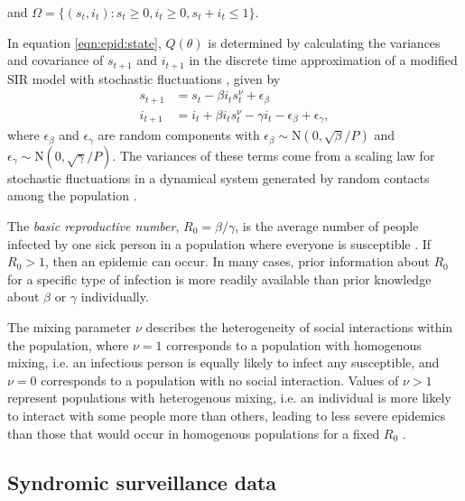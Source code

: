 \noindent and $\Omega = \{(s_t,i_t): s_t \ge 0, i_t \ge 0, s_t + i_t \le 1\}$.

In equation \eqref{eqn:epid:state}, $Q(\theta)$ is determined by calculating the variances and covariance of $s_{t+1}$ and $i_{t+1}$ in the discrete time approximation of a modified SIR model with stochastic fluctuations \citep{herwaarden1995stochepid, dangerfield2009stochepid, anderson2004sars}, given by
\begin{align}
s_{t+1} &= s_t - \beta i_ts^\nu_t + \epsilon_\beta \label{eqn:disc:sus} \\
i_{t+1} &= i_t + \beta i_ts^\nu_t - \gamma i_t - \epsilon_\beta + \epsilon_\gamma, \label{eqn:disc:inf}
\end{align}
where $\epsilon_\beta$ and $\epsilon_\gamma$ are random components with $\epsilon_\beta \sim \mbox{N}(0, \sqrt{\beta} / P)$ and $\epsilon_\gamma \sim \mbox{N}(0, \sqrt{\gamma} / P)$. The variances of these terms come from a scaling law for stochastic fluctuations in a dynamical system generated by random contacts among the population \citep{ovaskainen2010extinction, herwaarden1995stochepid, dangerfield2009stochepid, skvortsov2012monitoring}.

The \emph{basic reproductive number}, $R_0 = \beta / \gamma$, is the average number of people infected by one sick person in a population where everyone is susceptible \citep{heff2005repratio}. If $R_0 > 1$, then an epidemic can occur. In many cases, prior information about $R_0$ for a specific type of infection is more readily available than prior knowledge about $\beta$ or $\gamma$ individually.

The mixing parameter $\nu$ describes the heterogeneity of social interactions within the population, where $\nu = 1$ corresponds to a population with homogenous mixing, i.e. an infectious person is equally likely to infect any susceptible, and $\nu = 0$ corresponds to a population with no social interaction. Values of $\nu > 1$ represent populations with heterogenous mixing, i.e. an individual is more likely to interact with some people more than others, leading to less severe epidemics than those that would occur in homogenous populations for a fixed $R_0$ \citep{stroud2006powerlaw, novozhilov2008hetero}.

\subsection{Syndromic surveillance data \label{sec:epid:obs}}

